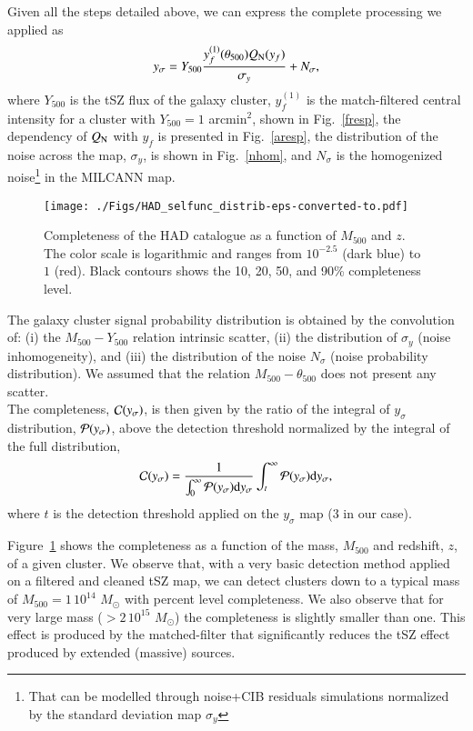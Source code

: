 \documentclass[traditabstract,a4,twocolumn]{aa}
\begin{document}
Given all the steps detailed above, we can express the complete processing we applied as
\begin{align}
y_\sigma =  Y_{500} \frac{ y^{(1)}_f (\theta_{500}) Q_{\rm N}(y_f)}{\sigma_y} + {N_\sigma},
\end{align}
where $Y_{500}$ is the tSZ flux of the galaxy cluster, $y^{(1)}_f$ is the
match-filtered central intensity for a cluster with $Y_{500} = 1$ arcmin$^2$, shown in
Fig.~\ref{fresp}, the dependency of $Q_{\rm N}$ with $y_f$ is
presented in Fig.~\ref{aresp}, the distribution of the noise across
the map, $\sigma_y$, is shown in Fig.~\ref{nhom}, and $N_\sigma$ is
the homogenized noise\footnote{That can be modelled through noise+CIB residuals simulations normalized by the standard deviation map $\sigma_y$} in the MILCANN map.\\
\begin{figure}[!th]
\begin{center}
\texttt{[image: ./Figs/HAD\_selfunc\_distrib-eps-converted-to.pdf]}
\caption{Completeness of the HAD catalogue as a function of $M_{500}$ and
  $z$. The color scale is logarithmic and ranges from $10^{-2.5}$
  (dark blue) to $1$ (red). Black contours shows the 10, 20, 50, and 90\% completeness level.}
\label{selfunc}
\end{center}
\end{figure}

The galaxy cluster signal probability distribution is obtained by the convolution of: (i) the $M_{500}-Y_{500}$ relation intrinsic scatter, (ii) the distribution of $\sigma_y$ (noise inhomogeneity), and (iii) the distribution of the noise $N_\sigma$ (noise probability distribution). 
We assumed that the relation
  $M_{500}-\theta_{500}$ does not present any scatter.\\ The completeness,
${\cal C}(y_\sigma)$, is then given by the ratio of the integral of
$y_\sigma$ distribution, ${\cal P}(y_\sigma)$, above the detection
threshold normalized by the integral of the full distribution,
\begin{align}
{\cal C}(y_\sigma) = \frac{1}{\int_{0}^{\infty} {\cal P}(y_\sigma) {\rm d}y_\sigma}\int_{t}^{\infty} {\cal P}(y_\sigma) {\rm d}y_\sigma,
\end{align}
where $t$ is the detection threshold applied on the $y_\sigma$ map (3 in our case).

Figure~\ref{selfunc} shows the completeness as a function of the mass,
$M_{500}$ and redshift, $z$, of a given cluster. We observe that, with a very basic detection method applied on a filtered and cleaned tSZ map, we
can detect
clusters down to a typical mass of $M_{500} = 1\, 10^{14}$
$M_\odot$ with percent level completeness. We also observe that for very large mass ($ > 2\, 10^{15}$
$M_\odot$) the completeness is slightly smaller than one. This effect is
produced by the matched-filter that significantly reduces the tSZ effect
produced by extended (massive) sources.
\end{document}
